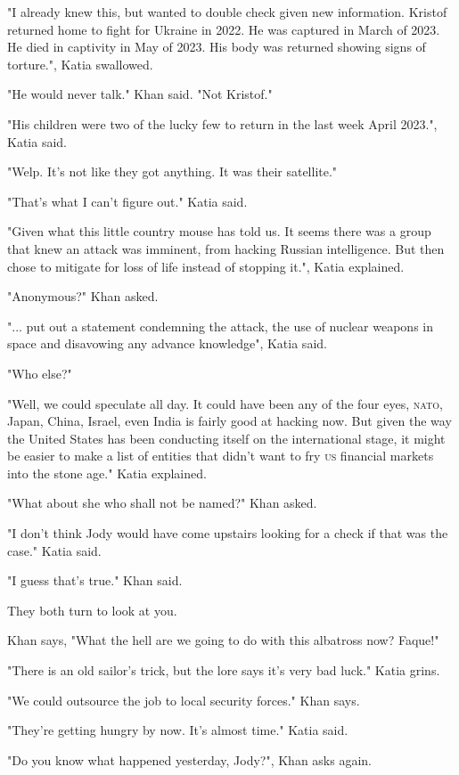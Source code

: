 \documentclass[a5paper, symmetric]{tufte-book}
\begin{document}
"I already knew this, but wanted to double check given new information. Kristof returned home to fight for Ukraine in 2022. He was captured in March of 2023. He died in captivity in May of 2023. His body was returned showing signs of torture.", Katia swallowed. 

"He would never talk." Khan said. "Not Kristof."

"His children were two of the lucky few to return in the last week April 2023.", Katia said. 

"Welp. It's not like they got anything. It was their satellite."

"That's what I can't figure out." Katia said. 

"Given what this little country mouse has told us. It seems there was a group that knew an attack was imminent, from hacking Russian intelligence. But then chose to mitigate for loss of life instead of stopping it.", Katia explained.

"Anonymous?" Khan asked.

"... put out a statement condemning the attack, the use of nuclear weapons in space and disavowing any advance knowledge", Katia said. 

"Who else?"

"Well, we could speculate all day. It could have been any of the four eyes, \textsc{nato}, Japan, China, Israel, even India is fairly good at hacking now. But given the way the United States has been conducting itself on the international stage, it might be easier to make a list of entities that didn't want to fry \textsc{us} financial markets into the stone age." Katia explained. 

"What about she who shall not be named?" Khan asked.

"I don't think Jody would have come upstairs looking for a check if that was the case." Katia said. 

"I guess that's true." Khan said. 

They both turn to look at you. 

Khan says, "What the hell are we going to do with this albatross now? Faque!"

"There is an old sailor's trick, but the lore says it's very bad luck." Katia grins. 

"We could outsource the job to local security forces." Khan says. 

"They're getting hungry by now. It's almost time." Katia said.

"Do you know what happened yesterday, Jody?", Khan asks again.
\end{document}
